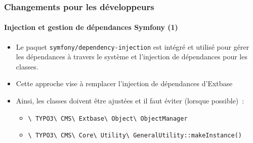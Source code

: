 \begin{frame}[fragile]
	\frametitle{Changements pour les développeurs}
	\framesubtitle{Injection et gestion de dépendances Symfony (1)}

	\begin{itemize}
		\item Le paquet \texttt{symfony/dependency-injection} est intégré et utilisé pour gérer
			les dépendances à travers le système et l'injection de dépendances pour les classes.

		\item Cette approche vise à remplacer l'injection de dépendances d'Extbase

		\item Ainsi, les classes doivent être ajustées et il faut éviter (lorsque possible)~:

			\begin{itemize}\small
				\item \texttt{\textbackslash
					TYPO3\textbackslash
					CMS\textbackslash
					Extbase\textbackslash
					Object\textbackslash
					ObjectManager}
				\item \texttt{\textbackslash
					TYPO3\textbackslash
					CMS\textbackslash
					Core\textbackslash
					Utility\textbackslash
					GeneralUtility::makeInstance()}
			\end{itemize}\normalsize

	\end{itemize}

\end{frame}



